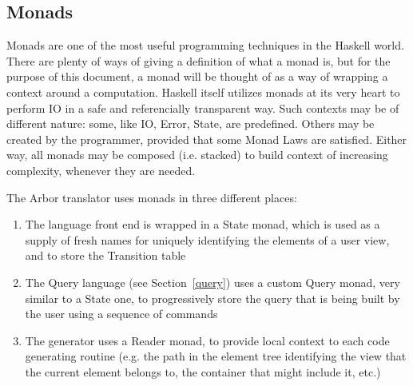 \documentclass[12pt]{article} %
\newcommand{\fe}{front end}
\newcommand{\A}{Arbor}
\newcommand{\Hs}{Haskell}
\begin{document}
\subsection{Monads}\label{monads}
Monads are one of the most useful programming techniques in the \Hs{} world. There are plenty of ways of giving a definition of what a monad is, but for the purpose of this document, a monad will be thought of as a way of wrapping a context around a computation. Haskell itself utilizes monads at its very heart to perform IO in a safe and referencially transparent way. Such contexts may be of different nature: some, like IO, Error, State, are predefined. Others may be created by the programmer, provided that some Monad Laws are satisfied. Either way, all monads may be composed (i.e. stacked) to build context of increasing complexity, whenever they are needed.

The \A{} translator uses monads in three different places:
\begin{enumerate}
\item The language \fe{} is wrapped in a State monad, which is used as a supply of fresh names for uniquely identifying the elements of a user view, and to store the Transition table
\item The Query language (see Section~\ref{query}) uses a custom Query monad, very similar to a State one, to progressively store the query that is being built by the user using a sequence of commands
\item The generator uses a Reader monad, to provide local context to each code generating routine (e.g. the path in the element tree identifying the view that the current element belongs to, the container that might include it, etc.)
\end{enumerate}
\end{document}
